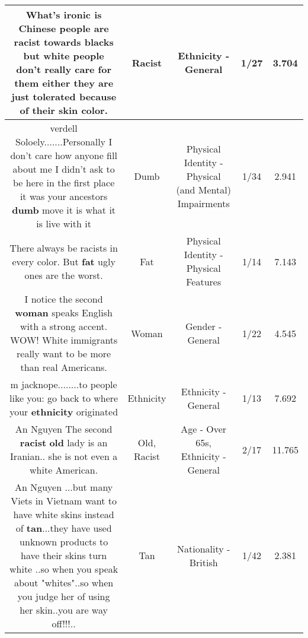 \documentclass[11pt]{article}
\newlength\mylength
\begin{document}
\begin{center}
\begin{longtable}{|C{.65\mylength}|C{.30\mylength}|C{.12\mylength}|C{.12\mylength}|C{.12\mylength}|}
  \small What's ironic is Chinese people are \textbf{racist} towards blacks but white people don't really care for them either they are just tolerated because of their skin color.\normalsize   & Racist & Ethnicity - General & 1/27 & 3.704 \\  \hline
  \small verdell  Soloely.......Personally I don't care how anyone fill about  me  I  didn't ask to be here in the first place  it was your  ancestors \textbf{dumb}  move it is what  it is live with it\normalsize   & Dumb & Physical Identity - Physical (and Mental) Impairments & 1/34 & 2.941 \\  \hline
  \small There always be racists in every color. But \textbf{fat} ugly ones are the worst.\normalsize   & Fat & Physical Identity - Physical Features & 1/14 & 7.143 \\  \hline
  \small I notice the second \textbf{woman} speaks English with a strong accent. WOW! White immigrants really want to be more than real Americans.\normalsize   & Woman & Gender - General & 1/22 & 4.545 \\  \hline
  \small m jacknope........to people like you: go back to where your \textbf{ethnicity} originated\normalsize   & Ethnicity & Ethnicity - General & 1/13 & 7.692 \\  \hline
  \small An Nguyen The second \textbf{racist} \textbf{old} lady is an Iranian.. she is not even a white American.\normalsize   & Old, Racist & Age - Over 65s, Ethnicity - General & 2/17 & 11.765 \\  \hline
  \small An Nguyen ...but many Viets in Vietnam want to have white skins instead of \textbf{tan}...they have used unknown products to have their skins  turn white ..so when you speak about "whites"..so when you judge her of using her skin..you are way off!!!..\normalsize   & Tan & Nationality - British & 1/42 & 2.381 \\  \hline

\end{longtable}
\end{center}
\end{document}
